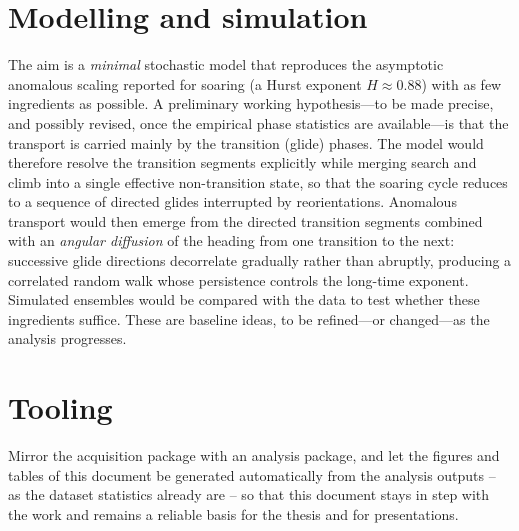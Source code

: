 \section{Modelling and simulation}
\label{sec:modelling}
The aim is a \emph{minimal} stochastic model that reproduces the asymptotic anomalous
scaling reported for soaring (a Hurst exponent $H \approx 0.88$) with as few ingredients as
possible. A preliminary working hypothesis---to be made precise, and possibly revised, once
the empirical phase statistics are available---is that the transport is carried mainly by
the transition (glide) phases. The model would therefore resolve the transition segments
explicitly while merging search and climb into a single effective non-transition state, so
that the soaring cycle reduces to a sequence of directed glides interrupted by
reorientations. Anomalous transport would then emerge from the directed transition segments
combined with an \emph{angular diffusion} of the heading from one transition to the next:
successive glide directions decorrelate gradually rather than abruptly, producing a
correlated random walk whose persistence controls the long-time exponent. Simulated
ensembles would be compared with the data to test whether these ingredients suffice. These
are baseline ideas, to be refined---or changed---as the analysis progresses.

\section{Tooling}
\label{sec:tooling}
Mirror the acquisition package with an analysis package, and let the figures and tables of
this document be generated automatically from the analysis outputs -- as the dataset
statistics already are -- so that this document stays in step with the work and remains a
reliable basis for the thesis and for presentations.
